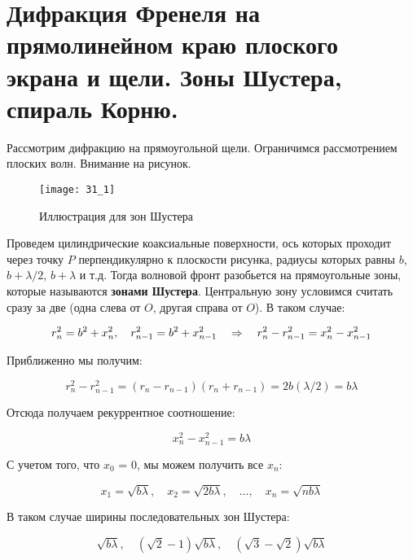 \section{Дифракция Френеля на прямолинейном краю плоского экрана и щели. Зоны Шустера, спираль Корню.}

Рассмотрим дифракцию на прямоугольной щели. Ограничимся рассмотрением плоских волн. Внимание на рисунок.

\begin{figure}[H]
	\centering
	\texttt{[image: 31\_1]}
	\caption{Иллюстрация для зон Шустера}
\end{figure}

Проведем цилиндрические коаксиальные поверхности, ось которых проходит через точку $P$ перпендикулярно к плоскости рисунка, радиусы которых равны $b$, $b + \lambda/2$, $b + \lambda$ и т.д. Тогда волновой фронт разобьется на прямоугольные зоны, которые называются \textbf{зонами Шустера}. Центральную зону условимся считать сразу за две (одна слева от $O$, другая справа от $O$). В таком случае:

\begin{equation*}
	r_n^2 = b^2 + x_n^2, \quad r_{n-1}^2 = b^2 + x_{n-1}^2 \quad \Rightarrow \quad r_n^2 - r_{n-1}^2 = x_n^2 - x_{n-1}^2
\end{equation*}

Приближенно мы получим:

\begin{equation*}
	r_n^2 - r_{n-1}^2 = (r_n - r_{n-1})(r_n + r_{n-1}) = 2 b (\lambda / 2) = b \lambda
\end{equation*}

Отсюда получаем рекуррентное соотношение:

\begin{equation*}
	x_n^2 - x_{n-1}^2 = b \lambda
\end{equation*}

С учетом того, что $x_0$ = 0, мы можем получить все $x_n$:

\begin{equation*}
	x_1 = \sqrt{b \lambda}, \quad x_2 = \sqrt{2 b \lambda}, \quad ..., \quad x_n = \sqrt{n b \lambda}
\end{equation*}

В таком случае ширины последовательных зон Шустера:

\begin{equation*}
	\sqrt{b \lambda}, \quad (\sqrt{2} - 1) \sqrt{b \lambda}, \quad (\sqrt{3} - \sqrt{2})\sqrt{b \lambda}
\end{equation*}

